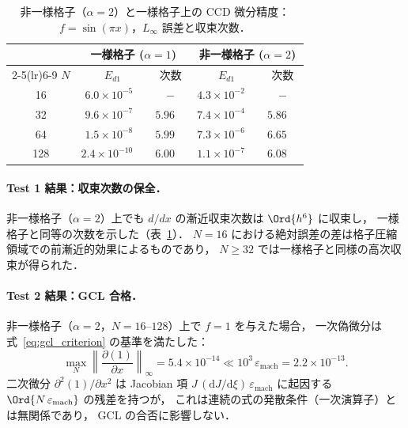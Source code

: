 \begin{table}[htbp]
\centering
\caption{非一様格子（$\alpha=2$）と一様格子上の CCD 微分精度：
  $f=\sin(\pi x)$，$L_\infty$ 誤差と収束次数．}
\label{tab:gcl_convergence}
\begin{tabular}{c
                r@{\ }l r@{\ }l
                r@{\ }l r@{\ }l}
\toprule
& \multicolumn{4}{c}{一様格子 ($\alpha=1$)}
& \multicolumn{4}{c}{非一様格子 ($\alpha=2$)} \\
\cmidrule(lr){2-5}\cmidrule(lr){6-9}
$N$
& \multicolumn{2}{c}{$E_{d1}$} & \multicolumn{2}{c}{次数}
& \multicolumn{2}{c}{$E_{d1}$} & \multicolumn{2}{c}{次数} \\
\midrule
 16 & $6.0\!\times\!10^{-5}$  & & $-$   & & $4.3\!\times\!10^{-2}$  & & $-$   & \\
 32 & $9.6\!\times\!10^{-7}$  & & $5.96$& & $7.4\!\times\!10^{-4}$  & & $5.86$& \\
 64 & $1.5\!\times\!10^{-8}$  & & $5.99$& & $7.3\!\times\!10^{-6}$  & & $6.65$& \\
128 & $2.4\!\times\!10^{-10}$ & & $6.00$& & $1.1\!\times\!10^{-7}$  & & $6.08$& \\
\bottomrule
\end{tabular}
\end{table}

\paragraph{Test 1 結果：収束次数の保全．}
非一様格子（$\alpha=2$）上でも $d/dx$ の漸近収束次数は $\Ord{h^6}$ に収束し，
一様格子と同等の次数を示した（表~\ref{tab:gcl_convergence}）．
$N=16$ における絶対誤差の差は格子圧縮領域での前漸近的効果によるものであり，
$N \geq 32$ では一様格子と同様の高次収束が得られた．

\paragraph{Test 2 結果：GCL 合格．}
非一様格子（$\alpha=2$，$N=16\text{--}128$）上で $f=1$ を与えた場合，
一次偽微分は式~\eqref{eq:gcl_criterion} の基準を満たした：
\[
  \max_{N}\left\|\frac{\partial(1)}{\partial x}\right\|_\infty
    = 5.4\!\times\!10^{-14}
    \ll 10^3\,\varepsilon_\mathrm{mach} = 2.2\!\times\!10^{-13}.
\]
二次微分 $\partial^2(1)/\partial x^2$ は Jacobian 項 $J\,(\mathrm{d}J/\mathrm{d}\xi)\,\varepsilon_\mathrm{mach}$
に起因する~$\Ord{N\,\varepsilon_\mathrm{mach}}$ の残差を持つが，
これは連続の式の発散条件（一次演算子）とは無関係であり，
GCL の合否に影響しない．
